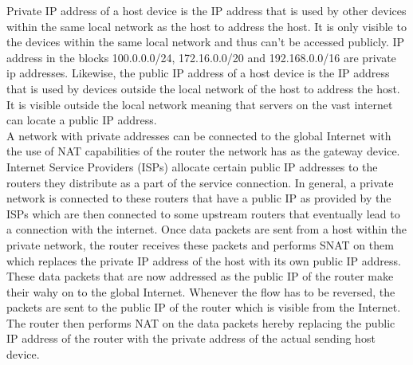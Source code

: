 \documentclass{home_assignment}
\begin{document}
Private IP address of a host device is the IP address that is used by other devices within the same local network as the host to address the host. It is only visible to the devices within the same local network and thus can't be accessed publicly. IP address in the blocks 100.0.0.0/24, 172.16.0.0/20 and 192.168.0.0/16 are private ip addresses. Likewise, the public IP address of a host device is the IP address that is used by devices outside the local network of the host to address the host. It is visible outside the local network meaning that servers on the vast internet can locate a public IP address. \\
A network with private addresses can be connected to the global Internet with the use of NAT capabilities of the router the network has as the gateway device. Internet Service Providers (ISPs) allocate certain public IP addresses to the routers they distribute as a part of the service connection. In general, a private network is connected to these routers that have a public IP as provided by the ISPs which are then connected to some upstream routers that eventually lead to a connection with the internet. Once data packets are sent from a host within the private network, the router receives these packets and performs SNAT on them which replaces the private IP address of the host with its own public IP address. These data packets that are now addressed as the public IP of the router make their wahy on to the global Internet. Whenever the flow has to be reversed, the packets are sent to the public IP of the router which is visible from the Internet. The router then performs NAT on the data packets hereby replacing the public IP address of the router with the private address of the actual sending host device. 
\end{document}
